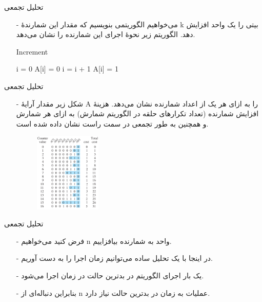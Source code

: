\begin{frame}{‌تحلیل تجمعی}
\begin{itemize}\itemr
\item[-]
می‌خواهیم الگوریتمی بنویسیم که مقدار این شمارندهٔ k بیتی را یک واحد افزایش دهد.
الگوریتم زیر نحوهٔ اجرای این شمارنده را نشان می‌دهد.
\begin{algorithm}[H]\alglr
  \caption{Increment} 
  \begin{algorithmic}[1]
    \State i = 0
    		\State A[i] = 0
    		\State i = i + 1
    \EndWhile
    		\State A[i] = 1
    \EndIf                  
  \end{algorithmic}
  \label{alg:merge}
\end{algorithm}
\end{itemize}
\end{frame}


\begin{frame}{‌تحلیل تجمعی}
\begin{itemize}\itemr
\item[-]
شکل زیر مقدار آرایهٔ A را به ازای هر یک از اعداد شمارنده نشان می‌دهد. هزینهٔ افزایش شمارنده (تعداد تکرارهای حلقه در الگوریتم شمارش) به ازای هر شمارش و همچنین به طور تجمعی در سمت راست نشان داده شده است.
\begin{figure}
\includegraphics[width=0.3\textwidth]{figs/chap02/counter-example2}
\end{figure}
\end{itemize}
\end{frame}


\begin{frame}{‌تحلیل تجمعی}
\begin{itemize}\itemr
\item[-]
فرض کنید می‌خواهیم n واحد به شمارنده بیافزاییم.
\item[-]
در اینجا با یک تحلیل ساده می‌توانیم زمان اجرا را به دست آوریم.
\item[-]
یک بار اجرای الگوریتم در بدترین حالت در زمان
اجرا می‌شود.
\item[-]
بنابراین دنباله‌ای از n عملیات به زمان
در بدترین حالت نیاز دارد.
\end{itemize}
\end{frame}


